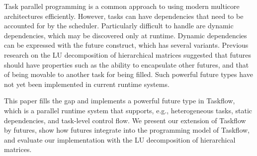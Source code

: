 Task parallel programming is a common approach to using modern multicore architectures efficiently. However, tasks can have dependencies that need to be accounted for by the scheduler. Particularly difficult to handle are dynamic dependencies, which may be discovered only at runtime. Dynamic dependencies can be expressed with the future construct, which has several variants. Previous research on the LU decomposition of hierarchical matrices suggested that futures should have properties such as the ability to encapsulate other futures, and that of being movable to another task for being filled. Such powerful future types have not yet been implemented in current runtime systems.

This paper fills the gap and implements a powerful future type in Taskflow, which is a parallel runtime system that supports, e.g., heterogeneous tasks, static dependencies, and task-level control flow. We present our extension of Taskflow by futures, show how futures integrate into the programming model of Taskflow, and evaluate our implementation with the LU decomposition of hierarchical matrices.
